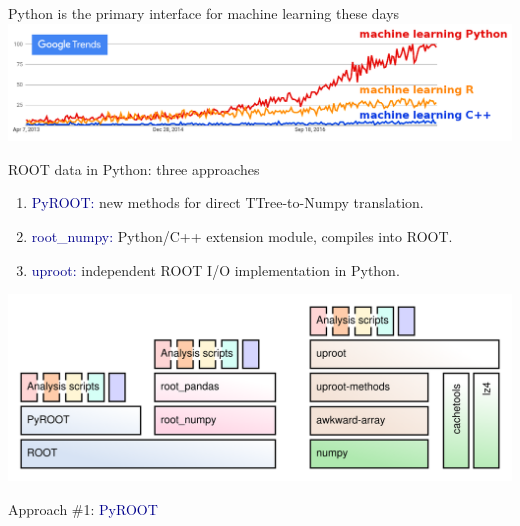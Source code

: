 \documentclass[aspectratio=169]{beamer}
\begin{document}
\begin{frame}{Python is the primary interface for machine learning these days}
\vspace{1 cm}
\includegraphics[width=\linewidth]{python-r-cpp-googletrends-machinelearning.png}
\end{frame}

\begin{frame}{ROOT data in Python: three approaches}
\vspace{0.3 cm}
\large
\begin{enumerate}
\item \textcolor{darkblue}{PyROOT:} new methods for direct TTree-to-Numpy translation.
\item \textcolor{darkblue}{root\_numpy:} Python/C++ extension module, compiles into ROOT.
\item \textcolor{darkblue}{uproot:} independent ROOT I/O implementation in Python.
\end{enumerate}

\vspace{0.2 cm}
\includegraphics[width=\linewidth]{abstraction-layers.png}
\end{frame}

\begin{frame}{}
\LARGE
\begin{center}
Approach \#1: \textcolor{darkblue}{PyROOT}
\end{center}
\end{frame}
\end{document}
